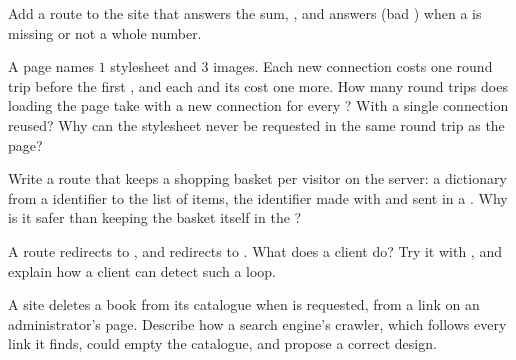 \begin{exercise}[$\star\star$]\label{exo:g10:http-clients-servers:11}
Add a route  to the site that answers the sum, , and answers  (bad )
when a  is missing or not a whole number.
\end{exercise}

\begin{exercise}[$\star\star\star$]\label{exo:g10:http-clients-servers:12}
A page names $1$ stylesheet and $3$ images. Each new connection costs one round trip before the first , and
each  and its  cost one more. How many round trips does loading the page take with a new connection
for every ? With a single connection reused? Why can the stylesheet never be requested in the same round trip
as the page?
\end{exercise}

\begin{exercise}[$\star\star\star$]\label{exo:g10:http-clients-servers:13}
Write a route  that keeps a shopping basket per visitor on the server: a dictionary from a
 identifier to the list of items, the identifier made with  and sent in a .
Why is it safer than keeping the basket itself in the ?
\end{exercise}

\begin{exercise}[$\star\star\star$]\label{exo:g10:http-clients-servers:14}
A route  redirects to , and  redirects to . What does a client do? Try it with
, and explain how a client can detect such a loop.
\end{exercise}

\begin{exercise}[$\star\star\star$]\label{exo:g10:http-clients-servers:15}
A site deletes a book from its catalogue when  is requested, from a link on an
administrator's page. Describe how a search engine's crawler, which follows every link it finds, could empty the
catalogue, and propose a correct design.
\end{exercise}

